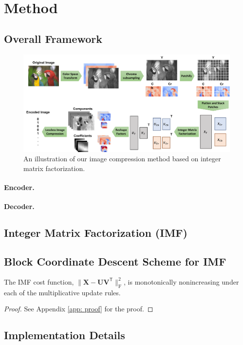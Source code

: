 \section{Method} \label{sec: method}



\subsection{Overall Framework} \label{sec: overall framework}


\begin{figure}[t]
	\centering
	\includegraphics[width=\linewidth]{figures/imf_encoder.pdf}
	\vspace{10pt}
	\caption{An illustration of our image compression method based on integer matrix factorization.}
	\label{fig: imf encoder}
\end{figure}

\paragraph{Encoder.}


\paragraph{Decoder.} 

\subsection{Integer Matrix Factorization (IMF)} \label{sec: imf}

\subsection{Block Coordinate Descent Scheme for IMF} \label{sec: bcd}



\begin{theorem}  \label{the: bcd monotonicity}
The IMF cost function, $\| \bm{X} - \bm{U} \bm{V}^\mathsf{T} \|_\text{F}^2$, is monotonically nonincreasing under each of the multiplicative update rules.
\end{theorem}

\begin{proof}
See Appendix \ref{app: proof} for the proof.
\end{proof}


\subsection{Implementation Details} \label{sec: implementation details}